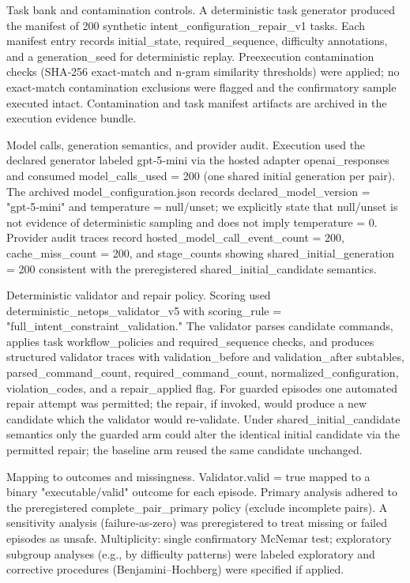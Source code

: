 \documentclass[conference]{IEEEtran}
\begin{document}
Task bank and contamination controls. A deterministic task generator produced the manifest of 200 synthetic intent\_configuration\_repair\_v1 tasks. Each manifest entry records initial\_state, required\_sequence, difficulty annotations, and a generation\_seed for deterministic replay. Preexecution contamination checks (SHA‑256 exact‑match and n‑gram similarity thresholds) were applied; no exact‑match contamination exclusions were flagged and the confirmatory sample executed intact. Contamination and task manifest artifacts are archived in the execution evidence bundle.

Model calls, generation semantics, and provider audit. Execution used the declared generator labeled gpt‑5‑mini via the hosted adapter openai\_responses and consumed model\_calls\_used = 200 (one shared initial generation per pair). The archived model\_configuration.json records declared\_model\_version = "gpt‑5‑mini" and temperature = null/unset; we explicitly state that null/unset is not evidence of deterministic sampling and does not imply temperature = 0. Provider audit traces record hosted\_model\_call\_event\_count = 200, cache\_miss\_count = 200, and stage\_counts showing shared\_initial\_generation = 200 consistent with the preregistered shared\_initial\_candidate semantics.

Deterministic validator and repair policy. Scoring used deterministic\_netops\_validator\_v5 with scoring\_rule = "full\_intent\_constraint\_validation." The validator parses candidate commands, applies task workflow\_policies and required\_sequence checks, and produces structured validator traces with validation\_before and validation\_after subtables, parsed\_command\_count, required\_command\_count, normalized\_configuration, violation\_codes, and a repair\_applied flag. For guarded episodes one automated repair attempt was permitted; the repair, if invoked, would produce a new candidate which the validator would re‑validate. Under shared\_initial\_candidate semantics only the guarded arm could alter the identical initial candidate via the permitted repair; the baseline arm reused the same candidate unchanged.

Mapping to outcomes and missingness. Validator.valid = true mapped to a binary "executable/valid" outcome for each episode. Primary analysis adhered to the preregistered complete\_pair\_primary policy (exclude incomplete pairs). A sensitivity analysis (failure‑as‑zero) was preregistered to treat missing or failed episodes as unsafe. Multiplicity: single confirmatory McNemar test; exploratory subgroup analyses (e.g., by difficulty patterns) were labeled exploratory and corrective procedures (Benjamini--Hochberg) were specified if applied.
\end{document}
